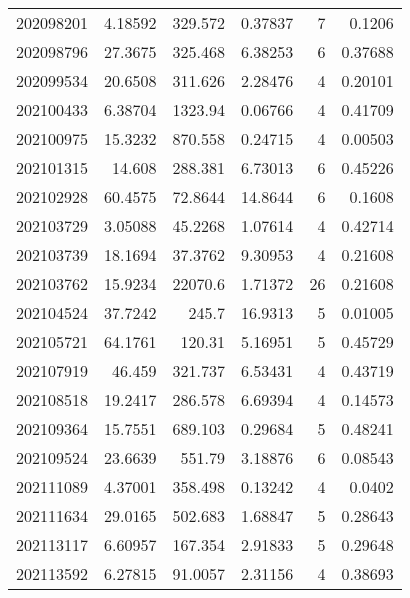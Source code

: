 \begin{tabular}{rrrrrr}
 202098201 &          4.18592 &      329.572  &            0.37837 &           7 & 0.1206  \\
 202098796 &         27.3675  &      325.468  &            6.38253 &           6 & 0.37688 \\
 202099534 &         20.6508  &      311.626  &            2.28476 &           4 & 0.20101 \\
 202100433 &          6.38704 &     1323.94   &            0.06766 &           4 & 0.41709 \\
 202100975 &         15.3232  &      870.558  &            0.24715 &           4 & 0.00503 \\
 202101315 &         14.608   &      288.381  &            6.73013 &           6 & 0.45226 \\
 202102928 &         60.4575  &       72.8644 &           14.8644  &           6 & 0.1608  \\
 202103729 &          3.05088 &       45.2268 &            1.07614 &           4 & 0.42714 \\
 202103739 &         18.1694  &       37.3762 &            9.30953 &           4 & 0.21608 \\
 202103762 &         15.9234  &    22070.6    &            1.71372 &          26 & 0.21608 \\
 202104524 &         37.7242  &      245.7    &           16.9313  &           5 & 0.01005 \\
 202105721 &         64.1761  &      120.31   &            5.16951 &           5 & 0.45729 \\
 202107919 &         46.459   &      321.737  &            6.53431 &           4 & 0.43719 \\
 202108518 &         19.2417  &      286.578  &            6.69394 &           4 & 0.14573 \\
 202109364 &         15.7551  &      689.103  &            0.29684 &           5 & 0.48241 \\
 202109524 &         23.6639  &      551.79   &            3.18876 &           6 & 0.08543 \\
 202111089 &          4.37001 &      358.498  &            0.13242 &           4 & 0.0402  \\
 202111634 &         29.0165  &      502.683  &            1.68847 &           5 & 0.28643 \\
 202113117 &          6.60957 &      167.354  &            2.91833 &           5 & 0.29648 \\
 202113592 &          6.27815 &       91.0057 &            2.31156 &           4 & 0.38693 \\

\end{tabular}
